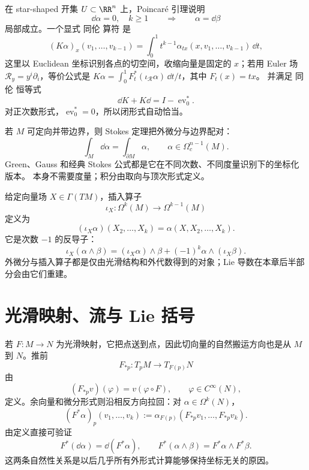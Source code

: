 在 star-shaped 开集 $U\subset\RR^n$ 上，Poincar\'e 引理说明
\[
\dd\alpha=0,
\quad k\ge1
\qquad\Longrightarrow\qquad
\alpha=\dd\beta
\]
局部成立。一个显式 同伦 算符 是
\begin{equation}
(K\alpha)_x(v_1,\ldots,v_{k-1})
=\int_0^1 t^{k-1}
\alpha_{tx}(x,v_1,\ldots,v_{k-1})\,\dd t,
\label{eq:poincare-homotopy-operator}
\end{equation}
这里以 Euclidean 坐标识别各点的切空间，收缩向量是固定的 $x$；若用 Euler 场 $\mathcal R_y=y^i\partial_i$，等价公式是 $K\alpha=\int_0^1F_t^*(\iota_{\mathcal R}\alpha)\,\dd t/t$，其中 $F_t(x)=tx$。
并满足 同伦 恒等式
\begin{equation}
\dd K+K\dd=I-\operatorname{ev}_0^*.
\label{eq:poincare-homotopy-identity}
\end{equation}
对正次数形式，$\operatorname{ev}_0^*=0$，所以闭形式自动恰当。

若 $M$ 可定向并带边界，则 Stokes 定理把外微分与边界配对：
\begin{equation}
\int_M\dd\alpha=\int_{\partial M}\alpha,
\qquad
\alpha\in\Omega_c^{n-1}(M).
\label{eq:stokes-general}
\end{equation}
Green、Gauss 和经典 Stokes 公式都是它在不同次数、不同度量识别下的坐标化版本。 本身不需要度量；积分由取向与顶次形式定义。

给定向量场 $X\in\Gamma(TM)$，插入算子
\begin{equation*}\iota_{X}:\Omega^k(M)\longrightarrow\Omega^{k-1}(M)
\end{equation*}
定义为
\[
(\iota_{X}\alpha)(X_2,\ldots,X_k)
=\alpha(X,X_2,\ldots,X_k).
\]
它是次数 $-1$ 的反导子：
\[
\iota_{X}(\alpha\wedge\beta)
=(\iota_{X}\alpha)\wedge\beta
+(-1)^k\alpha\wedge(\iota_{X}\beta).
\]
外微分与插入算子都是仅由光滑结构和外代数得到的对象；Lie 导数在本章后半部分会由它们重建。

\section{光滑映射、流与 Lie 括号}
若 $F:M\to N$ 为光滑映射，它把点送到点，因此切向量的自然搬运方向也是从 $M$ 到 $N$。推前
\begin{equation*}F_{*p}:T_pM\to T_{F(p)}N
\end{equation*}
由
\[
(F_{*p}v)(\varphi)=v(\varphi\circ F),
\qquad \varphi\in C^\infty(N),
\]
定义。余向量和微分形式则沿相反方向拉回：对 $\alpha\in\Omega^k(N)$，
\begin{equation*}(F^*\alpha)_p(v_1,\ldots,v_k)
:=\alpha_{F(p)}(F_{*p}v_1,\ldots,F_{*p}v_k).
\end{equation*}
由定义直接可验证
\begin{equation*}F^*(\dd\alpha)=\dd(F^*\alpha),
\qquad
F^*(\alpha\wedge\beta)=F^*\alpha\wedge F^*\beta.
\end{equation*}
这两条自然性关系是以后几乎所有外形式计算能够保持坐标无关的原因。

